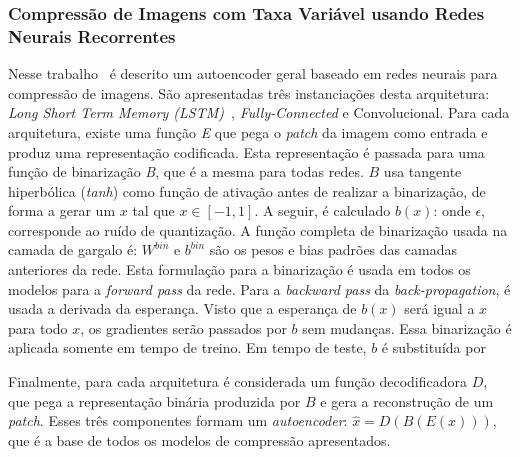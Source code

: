 \subsubsection{Compressão de Imagens com Taxa Variável usando Redes Neurais Recorrentes}
\label{variablerate}
Nesse trabalho~\cite{toderici2015variable} é descrito um autoencoder geral baseado em redes neurais para compressão de imagens. São apresentadas três instanciações desta arquitetura: \emph{Long Short Term Memory (LSTM)}~\cite{gers1999learning}, \textit{Fully-Connected} e Convolucional. Para cada arquitetura, existe uma função \textit{E} que pega o \textit{patch} da imagem como entrada e produz uma representação codificada. Esta representação é passada para uma função de binarização \textit{B}, que é a mesma para todas redes. $B$ usa tangente hiperbólica (\textit{tanh}) como função de ativação antes de realizar a binarização, de forma a gerar um $x$ tal que $x \in [-1, 1]$. A seguir, é calculado $b(x)$:   onde $\epsilon$, corresponde ao ruído de quantização. A função completa de binarização usada na camada de gargalo é: 
$W^{bin}$ e $b^{bin}$ são os pesos e bias padrões das camadas anteriores da rede. Esta formulação para a binarização é usada em todos os modelos para a \textit{forward pass} da rede. Para a \textit{backward pass} da \textit{back-propagation}, é usada a derivada da esperança. Visto que a esperança de $b(x)$ será igual a $x$ para todo $x$, os gradientes serão passados por $b$ sem mudanças. Essa binarização é aplicada somente em tempo de treino. Em tempo de teste, $b$ é substituída por 

Finalmente, para cada arquitetura é considerada um função decodificadora $D$, que pega a representação binária produzida 
por $B$ e gera a reconstrução de um \textit{patch}. Esses três componentes formam um \textit{autoencoder}: $\hat{x} = D(B(E(x)))$, que é a base de todos os modelos de compressão apresentados.


